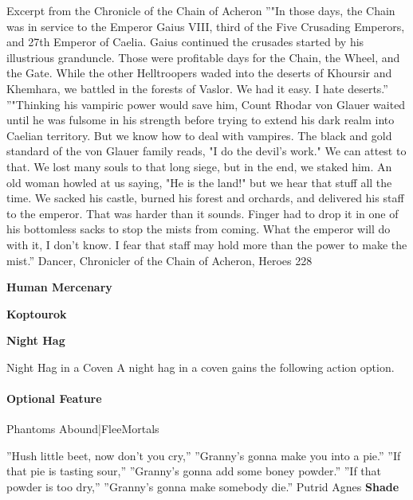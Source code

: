 \documentclass[10pt,a4paper,twoside,bg=print,twocolumn,openany,nodeprecatedcode]{dndbook}
\begin{document}
\begin{DndSidebar}[float=!b]{Excerpt from the Chronicle of the Chain of Acheron}
\DndQuote%
{}
{''"In those days, the Chain was in service to the Emperor Gaius VIII, third of the Five Crusading Emperors, and 27th Emperor of Caelia. Gaius continued the crusades started by his illustrious granduncle. Those were profitable days for the Chain, the Wheel, and the Gate. While the other Helltroopers waded into the deserts of Khoursir and Khemhara, we battled in the forests of Vaslor. We had it easy. I hate deserts.''}
{''"Thinking his vampiric power would save him, Count Rhodar von Glauer waited until he was fulsome in his strength before trying to extend his dark realm into Caelian territory. But we know how to deal with vampires. The black and gold standard of the von Glauer family reads, "I do the devil's work." We can attest to that. We lost many souls to that long siege, but in the end, we staked him. An old woman howled at us saying, "He is the land!" but we hear that stuff all the time. We sacked his castle, burned his forest and orchards, and delivered his staff to the emperor. That was harder than it sounds. Finger had to drop it in one of his bottomless sacks to stop the mists from coming. What the emperor will do with it, I don't know. I fear that staff may hold more than the power to make the mist.''}
{Dancer, Chronicler of the Chain of Acheron, Heroes 228}


\end{DndSidebar}

\textbf{Human Mercenary}

\textbf{Koptourok}

\textbf{Night Hag}

\begin{DndSidebar}[float=!b]{Night Hag in a Coven}
A night hag in a coven gains the following action option.



\paragraph{Optional Feature}
Phantoms Abound|FleeMortals



\end{DndSidebar}

\DndQuote%
{}
{''Hush little beet, now don't you cry,''}
{''Granny's gonna make you into a pie.''}
{''If that pie is tasting sour,''}
{''Granny's gonna add some boney powder.''}
{''If that powder is too dry,''}
{''Granny's gonna make somebody die.''}
{Putrid Agnes}
\textbf{Shade}
\end{document}
